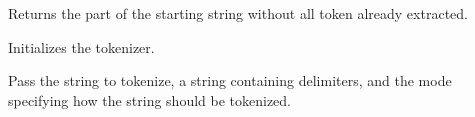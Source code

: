 
Returns the part of the starting string without all token already extracted.


\label{wxstringtokenizersetstring}


Initializes the tokenizer.

Pass the string to tokenize, a string containing delimiters,
and the mode specifying how the string should be tokenized.

